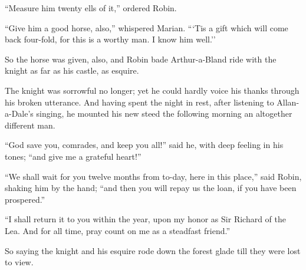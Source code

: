 ``Measure him twenty ells of it,'' ordered Robin.

``Give him a good horse, also,'' whispered Marian. ```Tis a gift which
will come back four-fold, for this is a worthy man. I know him well.''

So the horse was given, also, and Robin bade Arthur-a-Bland ride with
the knight as far as his castle, as esquire.

The knight was sorrowful no longer; yet he could hardly voice his thanks
through his broken utterance. And having spent the night in rest, after
listening to Allan-a-Dale's singing, he mounted his new steed the
following morning an altogether different man.

``God save you, comrades, and keep you all!'' said he, with deep feeling
in his tones; ``and give me a grateful heart!''

``We shall wait for you twelve months from to-day, here in this place,''
said Robin, shaking him by the hand; ``and then you will repay us the
loan, if you have been prospered.''

``I shall return it to you within the year, upon my honor as Sir Richard
of the Lea. And for all time, pray count on me as a steadfast friend.''

So saying the knight and his esquire rode down the forest glade till
they were lost to view.
